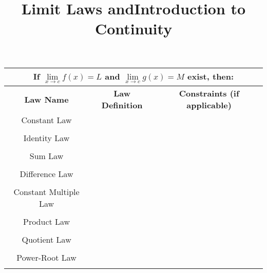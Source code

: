 \documentclass{siproblemset}
\title{Limit Laws and\linebreak Introduction to Continuity}
\begin{document}
    \maketitle
    
    
    \begin{center}
        \begin{tabular}{ |c|c|c| } 
            \hline
            \multicolumn{3}{|c|}{If $\lim\limits_{x\to c}f(x)=L$ and $\lim\limits_{x\to c}g(x)=M$ exist, then:}\\[4ex]
            \hline
            \textbf{Law Name} & \textbf{Law Definition} & \textbf{Constraints (if applicable)} \\ 
            \hline
            Constant Law & \hspace{3in} & \\ 
            &&\\
            \hline
            Identity Law & \hspace{3in} & \\ 
            &&\\
            \hline
            Sum Law & \hspace{3in} & \\ 
            &&\\
            \hline
            Difference Law & \hspace{3in} & \\ 
            &&\\
            \hline
            Constant Multiple Law & \hspace{3in} & \\ 
            &&\\
            \hline
            Product Law & \hspace{3in} & \\ 
            &&\\
            \hline
            Quotient Law & \hspace{3in} & \\ 
            &&\\
            \hline
            Power-Root Law & \hspace{3in} & \\ 
            &&\\
            \hline
        \end{tabular}
    \end{center}
\end{document}
